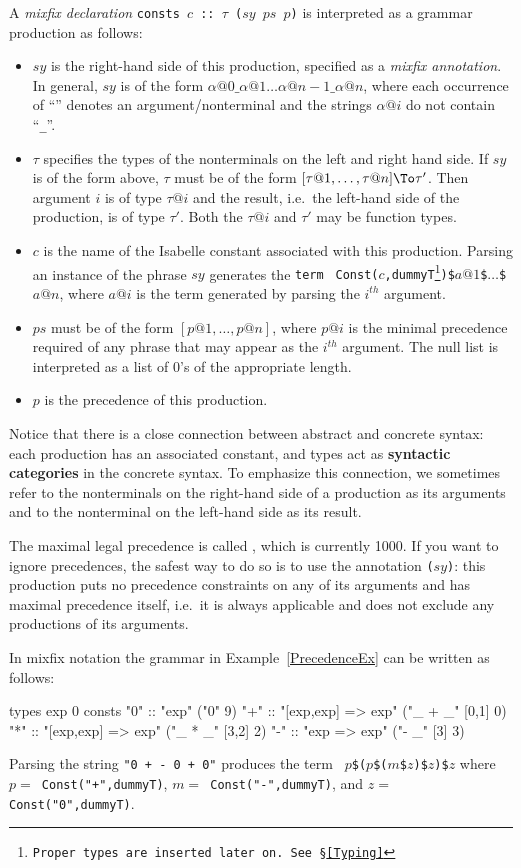 A {\em mixfix declaration} {\tt consts $c$ ::\ $\tau$ ($sy$ $ps$ $p$)} is
interpreted as a grammar pro\-duction as follows:
\begin{itemize}
\item $sy$ is the right-hand side of this production, specified as a {\em
    mixfix annotation}.  In general, $sy$ is of the form
  $\alpha@0\_\alpha@1\dots\alpha@{n-1}\_\alpha@n$, where each occurrence of
  ``\ttindex{_}'' denotes an argument/nonterminal and the strings
  $\alpha@i$ do not contain ``{\tt_}''.
\item $\tau$ specifies the types of the nonterminals on the left and right
  hand side. If $sy$ is of the form above, $\tau$ must be of the form
  $[\tau@1,\dots,\tau@n] \To \tau'$.  Then argument $i$ is of type $\tau@i$
  and the result, i.e.\ the left-hand side of the production, is of type
  $\tau'$.  Both the $\tau@i$ and $\tau'$ may be function types.
\item $c$ is the name of the Isabelle constant associated with this production.
  Parsing an instance of the phrase $sy$ generates the {\tt term} {\tt
    Const($c$,dummyT\footnote{Proper types are inserted later on.  See
      \S\ref{Typing}})\$$a@1$\$$\dots$\$$a@n$}, where $a@i$ is
  the term generated by parsing the $i^{th}$ argument.
\item $ps$ must be of the form $[p@1,\dots,p@n]$, where $p@i$ is the
  minimal precedence required of any phrase that may appear
  as the $i^{th}$ argument.  The null list is interpreted as a list of 0's of
  the appropriate length.
\item $p$ is the precedence of this production.
\end{itemize}
Notice that there is a close connection between abstract and concrete syntax:
each production has an associated constant, and types act as {\bf syntactic
  categories} in the concrete syntax.  To emphasize this connection, we
sometimes refer to the nonterminals on the right-hand side of a production as
its arguments and to the nonterminal on the left-hand side as its result.

The maximal legal precedence is called , which is
currently 1000.  If you want to ignore precedences, the safest way to do so is
to use the annotation {\tt($sy$)}: this production puts no precedence
constraints on any of its arguments and has maximal precedence itself, i.e.\ 
it is always applicable and does not exclude any productions of its
arguments.

\begin{example}
In mixfix notation the grammar in Example~\ref{PrecedenceEx} can be written
as follows:
\begin{ttbox}
types exp 0
consts "0"  ::              "exp"  ("0" 9)
       "+"  :: "[exp,exp] => exp"  ("_ + _" [0,1] 0)
       "*"  :: "[exp,exp] => exp"  ("_ * _" [3,2] 2)
       "-"  ::       "exp => exp"  ("- _"   [3]   3)
\end{ttbox}
Parsing the string \verb!"0 + - 0 + 0"! produces the term {\tt
  $p$\$($p$\$($m$\$$z$)\$$z$)\$$z$} where {\tt$p =$ Const("+",dummyT)},
{\tt$m =$ Const("-",dummyT)}, and {\tt$z =$ Const("0",dummyT)}.
\end{example}

